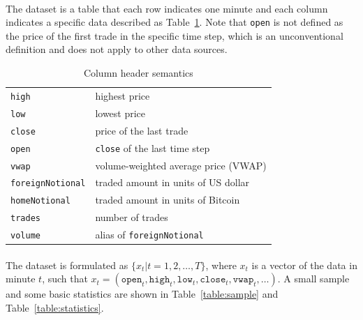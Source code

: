 \documentclass[12pt, letterpaper]{article}
\begin{document}
\paragraph{}
The dataset is a table that each row indicates one minute and each column indicates a specific data described as Table~\ref{table:column-header}. Note that \texttt{open} is not defined as the price of the first trade in the specific time step, which is an unconventional definition and does not apply to other data sources.

\begin{table}
    \centering
    \begin{tabular}{ll}
        \toprule
        \texttt{high} & highest price \\
        \texttt{low} & lowest price \\
        \texttt{close} & price of the last trade \\
        \texttt{open} & \texttt{close} of the last time step \\
        \texttt{vwap} & volume-weighted average price (VWAP) \\
        \texttt{foreignNotional} & traded amount in units of US dollar \\
        \texttt{homeNotional} & traded amount in units of Bitcoin \\
        \texttt{trades} & number of trades \\
        \texttt{volume} & alias of \texttt{foreignNotional} \\
        \bottomrule
    \end{tabular}
    \caption{Column header semantics}%
    \label{table:column-header}
\end{table}

\paragraph{}
The dataset is formulated as \( \{x_t|t=1,2,\dots,T\} \), where \(x_t\) is a vector of the data in minute \(t\), such that \(x_t=(\mathtt{open}_t,\mathtt{high}_t,\mathtt{low}_t,\mathtt{close}_t,\mathtt{vwap}_t,\dots)\). A small sample and some basic statistics are shown in Table~\ref{table:sample} and Table~\ref{table:statistics}.
\end{document}
